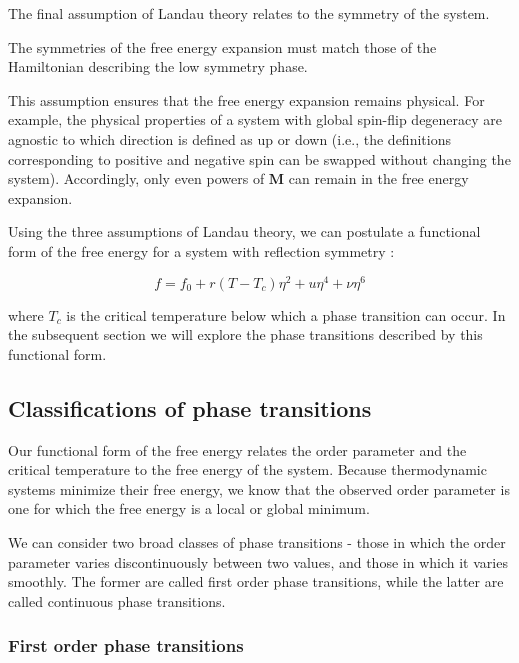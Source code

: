 The final assumption of Landau theory relates to the symmetry of the system.

\begin{assumption}
The symmetries of the free energy expansion must match those of the Hamiltonian describing the low symmetry phase.
\end{assumption}

This assumption ensures that the free energy expansion remains physical. For example, the physical properties of a system with global spin-flip degeneracy are agnostic to which direction is defined as up or down (i.e., the definitions corresponding to positive and negative spin can be swapped without changing the system). Accordingly, only even powers of $\mathbf{M}$ can remain in the free energy expansion.

Using the three assumptions of Landau theory, we can postulate a functional form of the free energy for a system with reflection symmetry \cite{Binder1987}:

\begin{equation}
f = f_{0} + r(T-T_{c}) \eta^{2} + u \eta^{4} + \nu \eta^{6}
\end{equation}

where $T_{c}$ is the critical temperature below which a phase transition can occur. In the subsequent section we will explore the phase transitions described by this functional form.

\subsection{Classifications of phase transitions}

Our functional form of the free energy relates the order parameter and the critical temperature to the free energy of the system. Because thermodynamic systems minimize their free energy, we know that the observed order parameter is one for which the free energy is a local or global minimum.

We can consider two broad classes of phase transitions - those in which the order parameter varies discontinuously between two values, and those in which it varies smoothly. The former are called first order phase transitions, while the latter are called continuous phase transitions.

\subsubsection{First order phase transitions}

